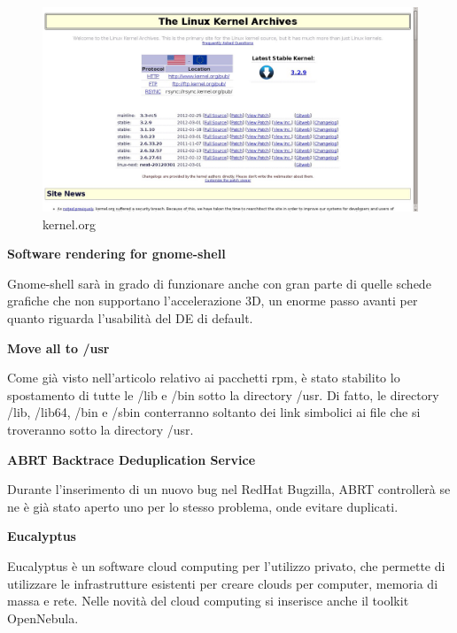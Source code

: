 \begin{figure}[htbp]
\centering
\includegraphics[scale=.20]{articoli/notizie/immagini/kernel.jpeg}
\caption{kernel.org}
\end{figure}

\begin{center}
{\centering\bfseries Software rendering for gnome-shell}
\end{center}
Gnome-shell sarà in grado di funzionare anche con gran parte di quelle schede grafiche che non supportano l'accelerazione 3D, un enorme passo avanti per quanto riguarda l'usabilità del DE di default.

\begin{center}
{\centering\bfseries Move all to /usr}
\end{center}
Come già visto nell'articolo relativo ai pacchetti rpm, è stato stabilito lo spostamento di tutte le /lib e /bin sotto la directory /usr. Di fatto, le directory /lib, /lib64, /bin e /sbin conterranno soltanto dei link simbolici ai file che si troveranno sotto la directory /usr.

\begin{center}
{\centering\bfseries ABRT Backtrace Deduplication Service}
\end{center}
Durante l'inserimento di un nuovo bug nel RedHat Bugzilla, ABRT controllerà se ne è già stato aperto uno per lo stesso problema, onde evitare duplicati.

\begin{center}
{\centering\bfseries Eucalyptus}
\end{center}
Eucalyptus è un software cloud computing per l'utilizzo privato, che permette di utilizzare le infrastrutture esistenti per creare clouds per computer, memoria di massa e rete. Nelle novità del cloud computing si inserisce anche il toolkit OpenNebula.

